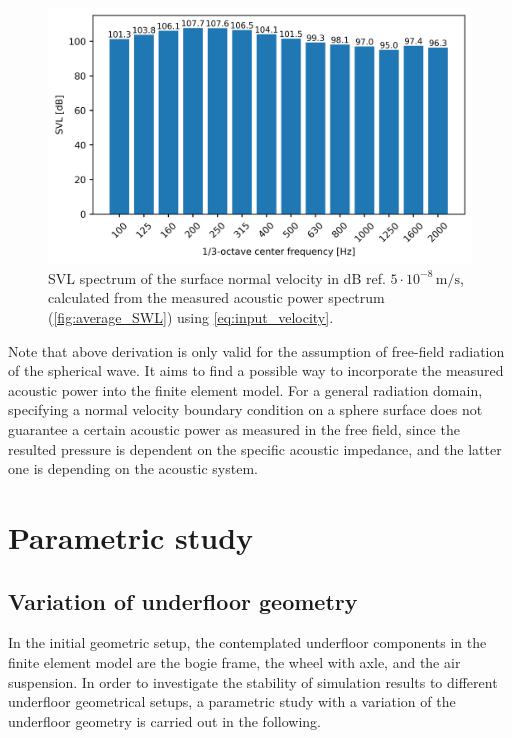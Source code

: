 {\begin{figure}
	\centering
	\includegraphics{fig/chap4/input_SVL.png}
	\caption{SVL spectrum of the surface normal velocity in dB ref. $5\cdot10^{-8}\,\text{m/s}$, calculated from the measured acoustic power spectrum (\cref{fig:average_SWL}) using \cref{eq:input_velocity}.}
	\label{fig:input_SVL}
\end{figure}

Note that above derivation is only valid for the assumption of free-field radiation of the spherical wave. It aims to find a possible way to incorporate the measured acoustic power into the finite element model. For a general radiation domain, specifying a normal velocity boundary condition on a sphere surface does not guarantee a certain acoustic power as measured in the free field, since the resulted pressure is dependent on the specific acoustic impedance, and the latter one is depending on the acoustic system.

\newpage
\section{Parametric study}
\label{section:parametric_study}
\subsection{Variation of underfloor geometry}
\label{section:variation_geometry}

In the initial geometric setup, the contemplated underfloor components in the finite element model are the bogie frame, the wheel with axle, and the air suspension. In order to investigate the stability of simulation results to different underfloor geometrical setups, a parametric study with a variation of the underfloor geometry is carried out in the following.

}

